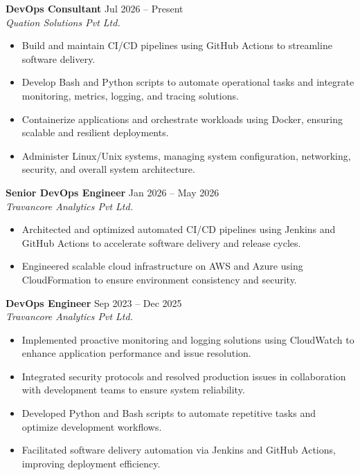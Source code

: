 \documentclass[a4paper,11pt]{article}
\begin{document}
\textbf{DevOps Consultant} \hfill Jul 2026 – Present \\
\textit{Quation Solutions Pvt Ltd.} \hfill
\begin{itemize}[nosep, leftmargin=0.2in]
    \item Build and maintain CI/CD pipelines using GitHub Actions to streamline software delivery.
    \item Develop Bash and Python scripts to automate operational tasks and integrate monitoring, metrics, logging, and tracing solutions.
    \item Containerize applications and orchestrate workloads using Docker, ensuring scalable and resilient deployments.
    \item Administer Linux/Unix systems, managing system configuration, networking, security, and overall system architecture.
\end{itemize}

\vspace{5pt}

\textbf{Senior DevOps Engineer} \hfill Jan 2026 – May 2026 \\
\textit{Travancore Analytics Pvt Ltd.} \hfill
\begin{itemize}[nosep, leftmargin=0.2in]
    \item Architected and optimized automated CI/CD pipelines using Jenkins and GitHub Actions to accelerate software delivery and release cycles.
    \item Engineered scalable cloud infrastructure on AWS and Azure using CloudFormation to ensure environment consistency and security.
\end{itemize}

\vspace{5pt}

\textbf{DevOps Engineer} \hfill Sep 2023 – Dec 2025 \\
\textit{Travancore Analytics Pvt Ltd.} \hfill
\begin{itemize}[nosep, leftmargin=0.2in]
    \item Implemented proactive monitoring and logging solutions using CloudWatch to enhance application performance and issue resolution.
    \item Integrated security protocols and resolved production issues in collaboration with development teams to ensure system reliability.
    \item Developed Python and Bash scripts to automate repetitive tasks and optimize development workflows.
    \item Facilitated software delivery automation via Jenkins and GitHub Actions, improving deployment efficiency.
\end{itemize}
\end{document}
